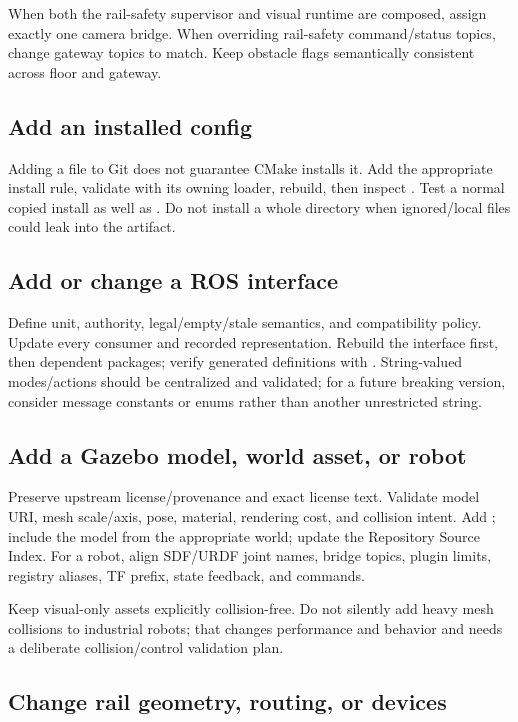 When both the rail-safety supervisor and visual runtime are composed, assign exactly one
camera bridge. When overriding rail-safety command/status topics, change gateway topics
to match. Keep obstacle flags semantically consistent across floor and gateway.

\subsection{Add an installed config}

Adding a file to Git does not guarantee CMake installs it. Add the appropriate
install rule, validate with its owning loader, rebuild, then inspect
. Test a normal copied
install as well as . Do not install a whole directory
when ignored/local files could leak into the artifact.

\subsection{Add or change a ROS interface}

Define unit, authority, legal/empty/stale semantics, and compatibility policy.
Update every consumer and recorded representation. Rebuild the interface first,
then dependent packages; verify generated definitions with
. String-valued modes/actions should be centralized
and validated; for a future breaking version, consider message constants or
enums rather than another unrestricted string.

\subsection{Add a Gazebo model, world asset, or robot}

Preserve upstream license/provenance and exact license text. Validate model
URI, mesh scale/axis, pose, material, rendering cost, and collision intent.
Add ; include the model from the appropriate world; update
the Repository Source Index. For a robot, align SDF/URDF joint names, bridge
topics, plugin limits, registry aliases, TF prefix, state feedback, and commands.

Keep visual-only assets explicitly collision-free. Do not silently add heavy
mesh collisions to industrial robots; that changes performance and behavior and
needs a deliberate collision/control validation plan.

\subsection{Change rail geometry, routing, or devices}

